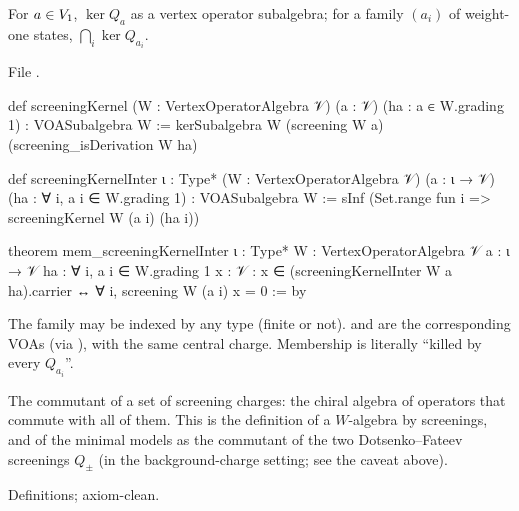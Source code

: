 \begin{definition}\label{l04:def:scrkernel}
For $a\in V_1$, $\ker Q_a$ as a vertex operator subalgebra; for a family $(a_i)$ of weight-one
states, $\bigcap_i\ker Q_{a_i}$.
\end{definition}
\noindent File .
\begin{leancode}
def screeningKernel (W : VertexOperatorAlgebra 𝒱) (a : 𝒱) (ha : a ∈ W.grading 1) :
    VOASubalgebra W :=
  kerSubalgebra W (screening W a) (screening_isDerivation W ha)

def screeningKernelInter {ι : Type*} (W : VertexOperatorAlgebra 𝒱) (a : ι → 𝒱)
    (ha : ∀ i, a i ∈ W.grading 1) : VOASubalgebra W :=
  sInf (Set.range fun i => screeningKernel W (a i) (ha i))

theorem mem_screeningKernelInter {ι : Type*} {W : VertexOperatorAlgebra 𝒱} {a : ι → 𝒱}
    {ha : ∀ i, a i ∈ W.grading 1} {x : 𝒱} :
    x ∈ (screeningKernelInter W a ha).carrier ↔ ∀ i, screening W (a i) x = 0 := by
\end{leancode}
\begin{dictionary}
The family may be indexed by any type  (finite or not).  and
 are the corresponding VOAs (via ), with the same central
charge. Membership is literally ``killed by every $Q_{a_i}$''.
\end{dictionary}
\begin{physics}
The commutant of a set of screening charges: the chiral algebra of operators that commute with all of
them. This is the definition of a $W$-algebra by screenings, and of the minimal models as the
commutant of the two Dotsenko--Fateev screenings $Q_\pm$ (in the background-charge setting; see the
caveat above).
\end{physics}
\begin{status}
Definitions; axiom-clean.
\end{status}

